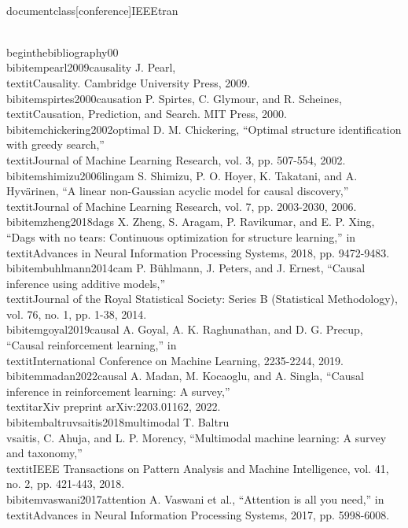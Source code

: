 \\documentclass[conference]{IEEEtran}
\begin{document}
\\begin{thebibliography}{00}
\\bibitem{pearl2009causality} J. Pearl, \\textit{Causality}. Cambridge University Press, 2009.
\\bibitem{spirtes2000causation} P. Spirtes, C. Glymour, and R. Scheines, \\textit{Causation, Prediction, and Search}. MIT Press, 2000.
\\bibitem{chickering2002optimal} D. M. Chickering, ``Optimal structure identification with greedy search,'' \\textit{Journal of Machine Learning Research}, vol. 3, pp. 507-554, 2002.
\\bibitem{shimizu2006lingam} S. Shimizu, P. O. Hoyer, K. Takatani, and A. Hyv\"arinen, ``A linear non-Gaussian acyclic model for causal discovery,'' \\textit{Journal of Machine Learning Research}, vol. 7, pp. 2003-2030, 2006.
\\bibitem{zheng2018dags} X. Zheng, S. Aragam, P. Ravikumar, and E. P. Xing, ``Dags with no tears: Continuous optimization for structure learning,'' in \\textit{Advances in Neural Information Processing Systems}, 2018, pp. 9472-9483.
\\bibitem{buhlmann2014cam} P. B\"uhlmann, J. Peters, and J. Ernest, ``Causal inference using additive models,'' \\textit{Journal of the Royal Statistical Society: Series B (Statistical Methodology)}, vol. 76, no. 1, pp. 1-38, 2014.
\\bibitem{goyal2019causal} A. Goyal, A. K. Raghunathan, and D. G. Precup, ``Causal reinforcement learning,'' in \\textit{International Conference on Machine Learning}, 2235-2244, 2019.
\\bibitem{madan2022causal} A. Madan, M. Kocaoglu, and A. Singla, ``Causal inference in reinforcement learning: A survey,'' \\textit{arXiv preprint arXiv:2203.01162}, 2022.
\\bibitem{baltruvsaitis2018multimodal} T. Baltru\\v{s}aitis, C. Ahuja, and L. P. Morency, ``Multimodal machine learning: A survey and taxonomy,'' \\textit{IEEE Transactions on Pattern Analysis and Machine Intelligence}, vol. 41, no. 2, pp. 421-443, 2018.
\\bibitem{vaswani2017attention} A. Vaswani et al., ``Attention is all you need,'' in \\textit{Advances in Neural Information Processing Systems}, 2017, pp. 5998-6008.
\end{document}
